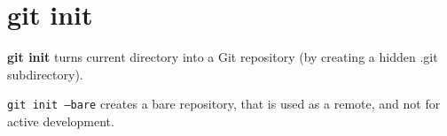 %

\section{git init}
\textbf{git init} turns current directory into a Git repository (by creating a hidden .git subdirectory).

\texttt{git init --bare} creates a bare repository, that is used as a remote, and not for active development.

%